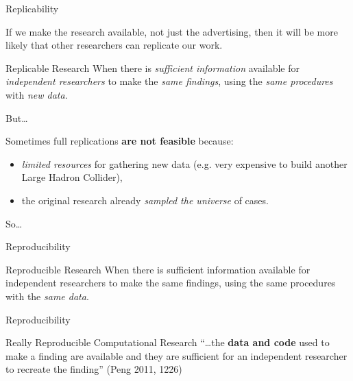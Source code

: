 \documentclass[10pt]{beamer}
\begin{document}
\begin{frame}{Replicability}

    If we make the research available, not just the advertising, then it will be {\large{more likely}} that other researchers can replicate our work.

    \vspace{1cm}

    \begin{exampleblock}{Replicable Research}
        When there is \emph{sufficient information} available for \emph{independent researchers} to make the \emph{same findings}, using the \emph{same procedures} with \emph{new data}.
    \end{exampleblock}

\end{frame}

\begin{frame}{But\ldots}

    Sometimes full replications \textbf{are not feasible} because:

    \begin{itemize}
        \item \emph{limited resources} for gathering new data (e.g. very expensive to build another Large Hadron Collider),

        \vspace{0.5cm}

        \item the original research already \emph{sampled the universe} of cases.
    \end{itemize}

    \vspace{0.5cm}

    {\large{So\ldots}}

\end{frame}

\begin{frame}{Reproducibility}

    \begin{exampleblock}{Reproducible Research}
        When there is sufficient information available for independent researchers to make the same findings, using the same procedures with the \emph{same data}.
    \end{exampleblock}

\end{frame}

\begin{frame}{Reproducibility}

    \begin{exampleblock}{Really Reproducible Computational Research}
        ``\ldots the \textbf{data and code} used to make a finding are available and they are sufficient for an independent researcher to recreate the finding'' (Peng 2011, 1226)
    \end{exampleblock}

\end{frame}
\end{document}
